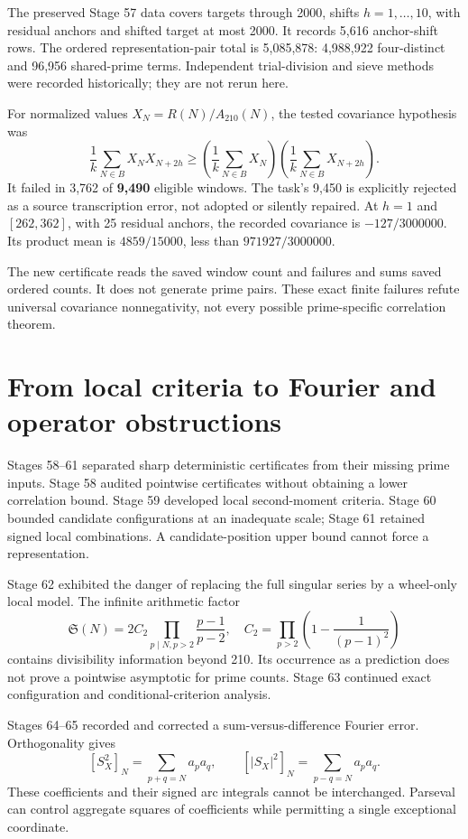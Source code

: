 \documentclass[11pt,a4paper]{article}
\newcommand{\Sg}{\mathfrak S}\newcommand{\e}{\mathrm e}
\begin{document}
The preserved Stage 57 data covers targets through 2000, shifts $h=1,\ldots,10$, with residual anchors and shifted target at most 2000. It records 5,616 anchor-shift rows. The ordered representation-pair total is 5,085,878: 4,988,922 four-distinct and 96,956 shared-prime terms. Independent trial-division and sieve methods were recorded historically; they are not rerun here.

For normalized values $X_N=R(N)/A_{210}(N)$, the tested covariance hypothesis was
\[
 \frac1k\sum_{N\in B}X_NX_{N+2h}\ge
 \left(\frac1k\sum_{N\in B}X_N\right)
 \left(\frac1k\sum_{N\in B}X_{N+2h}\right).
\]
It failed in 3,762 of \textbf{9,490} eligible windows. The task's 9,450 is explicitly rejected as a source transcription error, not adopted or silently repaired. At $h=1$ and $[262,362]$, with 25 residual anchors, the recorded covariance is $-127/3000000$. Its product mean is $4859/15000$, less than $971927/3000000$.

The new certificate reads the saved window count and failures and sums saved ordered counts. It does not generate prime pairs. These exact finite failures refute universal covariance nonnegativity, not every possible prime-specific correlation theorem.
\newpage
\section{From local criteria to Fourier and operator obstructions}
Stages 58--61 separated sharp deterministic certificates from their missing prime inputs. Stage 58 audited pointwise certificates without obtaining a lower correlation bound. Stage 59 developed local second-moment criteria. Stage 60 bounded candidate configurations at an inadequate scale; Stage 61 retained signed local combinations. A candidate-position upper bound cannot force a representation.

Stage 62 exhibited the danger of replacing the full singular series by a wheel-only local model. The infinite arithmetic factor
\[
 \Sg(N)=2C_2\prod_{p\mid N,p>2}\frac{p-1}{p-2},\quad
 C_2=\prod_{p>2}\left(1-\frac1{(p-1)^2}\right)
\]
contains divisibility information beyond 210. Its occurrence as a prediction does not prove a pointwise asymptotic for prime counts. Stage 63 continued exact configuration and conditional-criterion analysis.

Stages 64--65 recorded and corrected a sum-versus-difference Fourier error. Orthogonality gives
\[
 [S_X^2]_N=\sum_{p+q=N}a_pa_q,
 \qquad [|S_X|^2]_N=\sum_{p-q=N}a_pa_q.
\]
These coefficients and their signed arc integrals cannot be interchanged. Parseval can control aggregate squares of coefficients while permitting a single exceptional coordinate.
\end{document}
